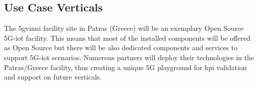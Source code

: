     
    

\newpage    
    \subsection{Use Case Verticals} 
    \label{chap:ucv}
    The \acrshort{5gvinni} facility site in Patras (Greece) will be an exemplary Open Source 5G-\acrshort{iot} facility. This means that most of the installed components will be offered as Open Source but there will be also dedicated components and services to support 5G-\acrshort{iot} scenarios. Numerous partners will deploy their technologies in the Patras/Greece facility, thus creating a unique 5G playground for \acrshort{kpi} validation and support on future verticals. 

